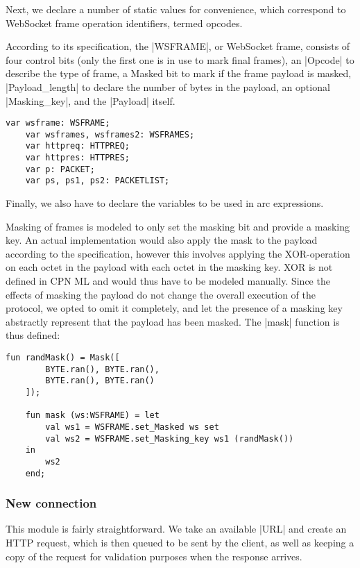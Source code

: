 	Next, we declare a number of static values for convenience, which correspond to
	WebSocket frame operation identifiers, termed opcodes. 
	
	According to its specification, the |WSFRAME|, or WebSocket frame, consists
	of four control bits (only the first one is in use to mark final frames), an
	|Opcode| to describe the type of frame, a Masked bit to mark if the frame
	payload is masked, |Payload_length| to declare the number of bytes in the
	payload, an optional |Masking_key|, and the |Payload| itself. 
	
	\begin{lstlisting}[label=lst:client_lib_vars,caption=Library
	variables,gobble=1]
	var wsframe: WSFRAME;
	var wsframes, wsframes2: WSFRAMES;
	var httpreq: HTTPREQ;
	var httpres: HTTPRES;
	var p: PACKET;
	var ps, ps1, ps2: PACKETLIST;
	\end{lstlisting}
	
	Finally, we also have to declare the variables to be used in arc expressions.
	
	Masking of frames is modeled to only set the masking bit and provide a masking
	key. An actual implementation would also apply the mask to the payload
	according to the specification, however this involves applying the
	XOR-operation on each octet in the payload with each octet in the masking key.
	XOR is not defined in CPN ML and would thus have to be modeled manually. Since
	the effects of masking the payload do not change the overall execution of the
	protocol, we opted to omit it completely, and let the presence of a masking key
	abstractly represent that the payload has been masked. The |mask| function is
	thus defined:
	
	 \begin{lstlisting}[label=lst:client_lib_vars,caption=Library
	variables,gobble=1]
	fun randMask() = Mask([
		BYTE.ran(), BYTE.ran(),
		BYTE.ran(),	BYTE.ran()
	]);
  
	fun mask (ws:WSFRAME) = let
		val ws1 = WSFRAME.set_Masked ws set
		val ws2 = WSFRAME.set_Masking_key ws1 (randMask())
	in 
		ws2
	end;
	\end{lstlisting}
     
	\subsubsection{New connection}
		
		
		This module is fairly straightforward. We take an available |URL|
		and create an HTTP request, which is then queued to be sent by the
		client, as well as keeping a copy of the request for validation purposes when
		the response arrives.
		
